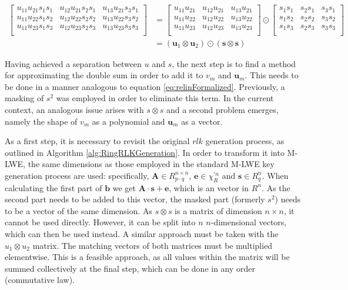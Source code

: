 \begin{align*}
  \begin{bmatrix}
    u_{11}u_{21}s_{1}s_{1} & u_{12}u_{21}s_{2}s_{1} & u_{13}u_{21}s_{3}s_{1} \\
    u_{11}u_{22}s_{1}s_{2} & u_{12}u_{22}s_{2}s_{2} & u_{13}u_{22}s_{3}s_{2} \\
    u_{11}u_{23}s_{1}s_{3} & u_{12}u_{23}s_{2}s_{3} & u_{13}u_{23}s_{3}s_{3} \\
  \end{bmatrix}
   & = \begin{bmatrix}
         u_{11}u_{21} & u_{12}u_{21} & u_{13}u_{21} \\
         u_{11}u_{22} & u_{12}u_{22} & u_{13}u_{22} \\
         u_{11}u_{23} & u_{12}u_{23} & u_{13}u_{23} \\
       \end{bmatrix} \odot \begin{bmatrix}
                             s_{1}s_{1} & s_{2}s_{1} & s_{3}s_{1} \\
                             s_{1}s_{2} & s_{2}s_{2} & s_{3}s_{2} \\
                             s_{1}s_{3} & s_{2}s_{3} & s_{3}s_{3} \\
                           \end{bmatrix}                \\
   & = (\textbf{u}_1 \otimes \textbf{u}_2) \odot (\textbf{s} \otimes \textbf{s} )
\end{align*}

Having achieved a separation between $u$ and $s$, the next step is to find a method for approximating the double sum in order to add it to $v_m$ and $\textbf{u}_m$. This needs to be done in a manner analogous to equation \ref{eq:relinFormalized}. Previously, a masking of $s^2$ was employed in order to eliminate this term. In the current context, an analogous issue arises with $s \otimes s$ and a second problem emerges, namely the shape of $v_m$ as a polynomial and $\textbf{u}_m$ as a vector.

As a first step, it is necessary to revisit the original $rlk$ generation process, as outlined in Algorithm \ref{alg:RingRLKGeneration}. In order to transform it into M-LWE, the same dimensions as those employed in the standard M-LWE key generation process are used: specifically, $\textbf{A} \in R^{n \times n}_{p \cdot q}$, $\textbf{e} \in \chi^{'n}_{R}$ and $\textbf{s} \in R^n_q$. When calculating the first part of $\textbf{b}$ we get $\textbf{A}\cdot \textbf{s} + \textbf{e}$, which is an vector in $R^n$. As the second part needs to be added to this vector, the masked part (formerly $s^2$) needs to be a vector of the same dimension. As $s \otimes s$ is a matrix of dimension $n \times n$, it cannot be used directly. However, it can be split into $n$ $n$-dimensional vectors, which can then be used instead. A similar approach must be taken with the $u_1 \otimes u_2$ matrix. The matching vectors of both matrices must be multiplied elementwise. This is a feasible approach, as all values within the matrix will be summed collectively at the final step, which can be done in any order (commutative law).

